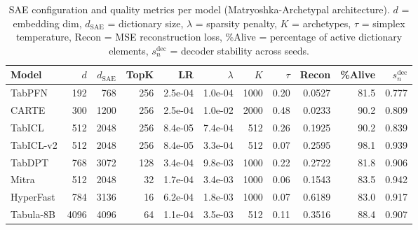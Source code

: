 \begin{table}[h]
\centering
\small
\begin{tabular}{lrrrrrrr rrr}
\toprule
Model & $d$ & $d_{\text{SAE}}$ & TopK & LR & $\lambda$ & $K$ & $\tau$ & Recon & \%Alive & $s_n^{\text{dec}}$ \\
\midrule
TabPFN & 192 & 768 & 256 & 2.5e-04 & 1.0e-04 & 1000 & 0.20 & 0.0527 & 81.5 & 0.777 \\
CARTE & 300 & 1200 & 256 & 2.5e-04 & 1.0e-02 & 2000 & 0.48 & 0.0233 & 90.2 & 0.809 \\
TabICL & 512 & 2048 & 256 & 8.4e-05 & 7.4e-04 & 512 & 0.26 & 0.1925 & 90.2 & 0.839 \\
TabICL-v2 & 512 & 2048 & 256 & 8.4e-05 & 3.3e-04 & 512 & 0.07 & 0.2595 & 98.1 & 0.939 \\
TabDPT & 768 & 3072 & 128 & 3.4e-04 & 9.8e-03 & 1000 & 0.22 & 0.2722 & 81.8 & 0.906 \\
Mitra & 512 & 2048 & 32 & 1.7e-04 & 3.4e-03 & 1000 & 0.06 & 0.1543 & 83.5 & 0.942 \\
HyperFast & 784 & 3136 & 16 & 6.2e-04 & 1.8e-03 & 1000 & 0.07 & 0.6189 & 83.0 & 0.917 \\
Tabula-8B & 4096 & 4096 & 64 & 1.1e-04 & 3.5e-03 & 512 & 0.11 & 0.3516 & 88.4 & 0.907 \\
\bottomrule
\end{tabular}
\caption{SAE configuration and quality metrics per model (Matryoshka-Archetypal architecture). $d$ = embedding dim, $d_{\text{SAE}}$ = dictionary size, $\lambda$ = sparsity penalty, $K$ = archetypes, $\tau$ = simplex temperature, Recon = MSE reconstruction loss, \%Alive = percentage of active dictionary elements, $s_n^{\text{dec}}$ = decoder stability across seeds.}
\label{tab:sae_hyperparameters}
\end{table}
